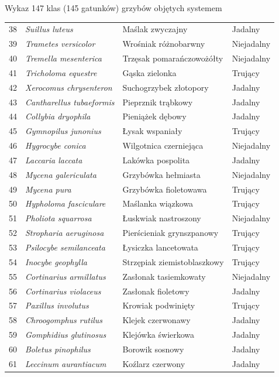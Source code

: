\begin{easyappendix}{Wykaz 147 klas (145 gatunków) grzybów objętych systemem}
\begin{longtable}{|r|l|l|l|}
38 & \textit{Suillus luteus} & Maślak zwyczajny & Jadalny \\
39 & \textit{Trametes versicolor} & Wrośniak różnobarwny & Niejadalny \\
40 & \textit{Tremella mesenterica} & Trzęsak pomarańczowożółty & Niejadalny \\
41 & \textit{Tricholoma equestre} & Gąska zielonka & Trujący\\
42 & \textit{Xerocomus chrysenteron} & Suchogrzybek złotopory & Jadalny \\
43 & \textit{Cantharellus tubaeformis} & Pieprznik trąbkowy & Jadalny \\
44 & \textit{Collybia dryophila} & Pieniążek dębowy & Jadalny \\
45 & \textit{Gymnopilus junonius} & Łysak wspaniały & Trujący \\
46 & \textit{Hygrocybe conica} & Wilgotnica czerniejąca & Niejadalny \\
47 & \textit{Laccaria laccata} & Lakówka pospolita & Jadalny \\
48 & \textit{Mycena galericulata} & Grzybówka hełmiasta & Niejadalny \\
49 & \textit{Mycena pura} & Grzybówka fioletowawa & Trujący \\
50 & \textit{Hypholoma fasciculare} & Maślanka wiązkowa & Trujący \\
51 & \textit{Pholiota squarrosa} & Łuskwiak nastroszony & Niejadalny \\
52 & \textit{Stropharia aeruginosa} & Pierścieniak grynszpanowy & Trujący\\
53 & \textit{Psilocybe semilanceata} & Łysiczka lancetowata & Trujący \\
54 & \textit{Inocybe geophylla} & Strzępiak ziemistoblaszkowy & Trujący \\
55 & \textit{Cortinarius armillatus} & Zasłonak tasiemkowaty & Niejadalny \\
56 & \textit{Cortinarius violaceus} & Zasłonak fioletowy & Jadalny \\
57 & \textit{Paxillus involutus} & Krowiak podwinięty & Trujący \\
58 & \textit{Chroogomphus rutilus} & Klejek czerwonawy & Jadalny \\
59 & \textit{Gomphidius glutinosus} & Klejówka świerkowa & Jadalny \\
60 & \textit{Boletus pinophilus} & Borowik sosnowy & Jadalny \\
61 & \textit{Leccinum aurantiacum} & Koźlarz czerwony & Jadalny \\

\end{longtable}
\end{easyappendix}
